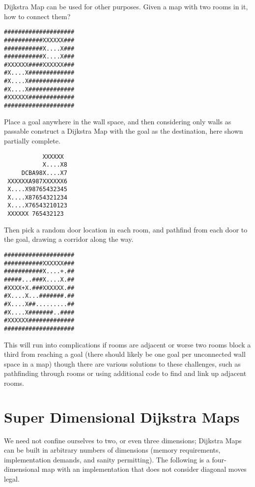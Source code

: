 \documentclass[12pt,a4paper]{article}
\begin{document}
Dijkstra Map can be used for other purposes. Given a map with two rooms
in it, how to connect them?

\begin{verbatim}
####################
###########XXXXXX###
###########X....X###
###########X....X###
#XXXXXX####XXXXXX###
#X....X#############
#X....X#############
#X....X#############
#XXXXXX#############
####################
\end{verbatim}

Place a goal anywhere in the wall space, and then considering only walls
\texttt{} as passable construct a Dijkstra Map with the goal
as the destination, here shown partially complete.

\begin{verbatim}
           XXXXXX   
           X....X8  
     DCBA98X....X7  
 XXXXXXA987XXXXXX6  
 X....X98765432345  
 X....X87654321234  
 X....X76543210123  
 XXXXXX 765432123   
\end{verbatim}

Then pick a random door location in each room, and pathfind from each
door to the goal, drawing a corridor along the way.

\begin{verbatim}
####################
###########XXXXXX###
###########X....+.##
#####...###X....X.##
#XXXX+X.###XXXXXX.##
#X....X...#######.##
#X....X##.........##
#X....X#######..####
#XXXXXX#############
####################
\end{verbatim}

This will run into complications if rooms are adjacent or worse two
rooms block a third from reaching a goal (there should likely be one
goal per unconnected wall space in a map) though there are various
solutions to these challenges, such as pathfinding through rooms or
using additional code to find and link up adjacent rooms.

\section*{Super Dimensional Dijkstra Maps}

We need not confine ourselves to two, or even three dimensions;
Dijkstra Maps can be built in arbitrary numbers of dimensions
(memory requirements, implementation demands, and sanity
permitting). The following is a four-dimensional map with an
implementation\cite{crazylisp} that does not consider diagonal
moves legal.
\end{document}
